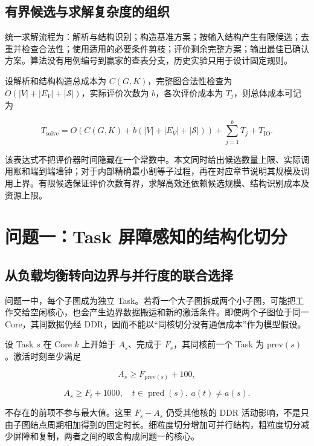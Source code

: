 \documentclass[anonymous,notoc]{gmcm2026}
\begin{document}
\subsection{有界候选与求解复杂度的组织}\label{ux6709ux754cux5019ux9009ux4e0eux6c42ux89e3ux590dux6742ux5ea6ux7684ux7ec4ux7ec7}

统一求解流程为：解析与结构识别；构造基准方案；按输入结构产生有限候选；去重并检查合法性；使用适用的必要条件剪枝；评价剩余完整方案；输出最佳已确认方案。算法没有用例编号到赢家的查表分支，历史实验只用于设计固定规则。

设解析和结构构造总成本为 \(C(G,K)\)，完整图合法性检查为 \(O(|V|+|E_V|+|\mathcal S|)\)，实际评价次数为 \(b\)，各次评价成本为 \(T_j\)，则总体成本可记为

\[T_{\mathrm{solve}}=O\!\left(C(G,K)+b(|V|+|E_V|+|\mathcal S|)\right)+\sum_{j=1}^{b}T_j+T_{\mathrm{IO}}.\]

该表达式不把评价器时间隐藏在一个常数中。本文同时给出候选数量上限、实际调用账和端到端墙钟；对于内部精确最小割等子过程，再在对应章节说明其规模及调用上界。有限候选保证评价次数有界，求解高效还依赖候选规模、结构识别成本及资源上限。

\FloatBarrier

\section{问题一：Task 屏障感知的结构化切分}\label{ux95eeux9898ux4e00task-ux5c4fux969cux611fux77e5ux7684ux7ed3ux6784ux5316ux5207ux5206}

\subsection{从负载均衡转向边界与并行度的联合选择}\label{ux4eceux8d1fux8f7dux5747ux8861ux8f6cux5411ux8fb9ux754cux4e0eux5e76ux884cux5ea6ux7684ux8054ux5408ux9009ux62e9}

问题一中，每个子图成为独立 Task。若将一个大子图拆成两个小子图，可能把工作交给空闲核心，也会产生边界数据搬运和新的激活条件。即使两个子图位于同一 Core，其间数据仍经 DDR，因而不能以``同核切分没有通信成本''作为模型假设。

设 Task \(s\) 在 Core \(k\) 上开始于 \(A_s\)、完成于 \(F_s\)，其同核前一个 Task 为 \(\mathrm{prev}(s)\)。激活时刻至少满足

\[A_s\ge F_{\mathrm{prev}(s)}+100,\]

\[A_s\ge F_t+1000,\quad t\in\operatorname{pred}(s),\ a(t)\ne a(s).\]

不存在的前项不参与最大值。这里 \(F_s-A_s\) 仍受其他核的 DDR 活动影响，不是只由子图结点周期相加得到的固定时长。细粒度切分增加可并行结构，粗粒度切分减少屏障和复制，两者之间的取舍构成问题一的核心。
\end{document}
